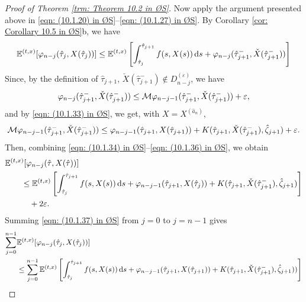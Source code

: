 \begin{proof}[Proof of Theorem \ref{trm: Theorem 10.2 in ØS}]
    Now apply the argument presented above in \eqref{eqn: (10.1.20) in ØS}--\eqref{eqn: (10.1.27) in ØS}. By Corollary \ref{cor: Corollary 10.5 in ØS}b, we have
    \begin{equation}
        \mathbb{E}^{(t,x)} [\varphi_{n-j}(\hat{\tau}_j, X(\hat{\tau}_j))] \leq \mathbb{E}^{(t,x)} \left[ \int_{\hat{\tau}_j}^{\hat{\tau}_{j+1}}f(s,X(s)) \,\mathrm{d} s + \varphi_{n-j}(\hat{\tau}_{j+1}^-, \check{X}(\hat{\tau}_{j+1}^-)) \right]
        \label{eqn: (10.1.34) in ØS}
    \end{equation}
    Since, by the definition of $\hat{\tau}_{j+1}$, $\check{X}(\hat{\tau}_{j+1}^-) \notin D^{(\varepsilon)}_{n-j}$, we have
    \begin{equation}
        \varphi_{n-j}(\hat{\tau}_{j+1}^-, \check{X}(\hat{\tau}_{j+1}^-)) \leq \mathcal{M} \varphi_{n-j-1}(\hat{\tau}_{j+1}^-, \check{X}(\hat{\tau}_{j+1}^-)) + \varepsilon,
        \label{eqn: (10.1.35) in ØS}
    \end{equation}
    and by \eqref{eqn: (10.1.33) in ØS}, we get, with $X=X^{(\hat{a}_n)}$,
    \begin{equation}
        \mathcal{M} \varphi_{n-j-1}(\hat{\tau}_{j+1}^-,\check{X}(\hat{\tau}_{j+1}^-)) \leq \varphi_{n-j-1}(\hat{\tau}_{j+1}, X(\hat{\tau}_{j+1})) + K(\hat{\tau}_{j+1},\check{X}(\hat{\tau}_{j+1}^-), \hat{\zeta}_{j+1}) + \varepsilon.
        \label{eqn: (10.1.36) in ØS}
    \end{equation}
    Then, combining \eqref{eqn: (10.1.34) in ØS}--\eqref{eqn: (10.1.36) in ØS}, we obtain
    \begin{align}
        &\mathbb{E}^{(t,x)} [\varphi_{n-j}(\hat{\tau}, X(\hat{\tau}))] \nonumber \\
        & \qquad \leq \mathbb{E}^{(t,x)} \left[ \int_{\hat{\tau}_{j}}^{\hat{\tau}_{j+1}} f(s,X(s)) \,\mathrm{d} s + \varphi_{n-j-1}(\hat{\tau}_{j+1}, X(\hat{\tau}_{j})) + K(\hat{\tau}_{j+1},\check{X}(\hat{\tau}_{j+1}^-), \hat{\zeta}_{j+1}) \right] \nonumber\\
        & \qquad \quad+ 2 \varepsilon. 
        \label{eqn: (10.1.37) in ØS}
    \end{align}
    Summing \eqref{eqn: (10.1.37) in ØS} from $j=0$ to $j=n-1$ gives
    \begin{align}
        \sum_{j=0}^{n-1} &\Etx[\varphi_{n-j}(\hat{\tau}_j, X(\hat{\tau}_j))] \nonumber \\
        &\leq \sum_{j=0}^{n-1} \Etx \left[ \int_{\hat{\tau}_j}^{\hat{\tau}_{j+1}}f(s,X(s)) \diff s + \varphi_{n-j-1}(\hat{\tau}_{j+1}, X(\hat{\tau}_{j+1})) + K(\hat{\tau}_{j+1},\check{X}(\hat{\tau}_{j+1}^-), \hat{\zeta}_{j+1})) \right] \nonumber \\

\end{align}
\end{proof}

